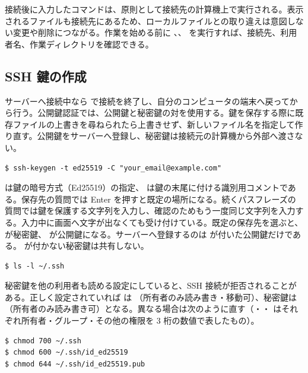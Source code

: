 接続後に入力したコマンドは、原則として接続先の計算機上で実行される。表示されるファイルも接続先にあるため、ローカルファイルとの取り違えは意図しない変更や削除につながる。作業を始める前に 、、 を実行すれば、接続先、利用者名、作業ディレクトリを確認できる。

\subsection{SSH 鍵の作成}

サーバーへ接続中なら  で接続を終了し、自分のコンピュータの端末へ戻ってから行う。公開鍵認証では、公開鍵と秘密鍵の対を使用する。鍵を保存する際に既存ファイルの上書きを尋ねられたら上書きせず、新しいファイル名を指定して作り直す。公開鍵をサーバーへ登録し、秘密鍵は接続元の計算機から外部へ渡さない。

\begin{lstlisting}[numbers=none, xleftmargin=2\zw]
$ ssh-keygen -t ed25519 -C "your_email@example.com"
\end{lstlisting}

 は鍵の暗号方式（Ed25519）の指定、 は鍵の末尾に付ける識別用コメントである。保存先の質問では Enter を押すと既定の場所になる。続くパスフレーズの質問では鍵を保護する文字列を入力し、確認のためもう一度同じ文字列を入力する。入力中に画面へ文字が出なくても受け付けている。既定の保存先を選ぶと、 が秘密鍵、 が公開鍵になる。サーバーへ登録するのは  が付いた公開鍵だけである。 が付かない秘密鍵は共有しない。

\begin{lstlisting}[numbers=none, xleftmargin=2\zw]
$ ls -l ~/.ssh
\end{lstlisting}

秘密鍵を他の利用者も読める設定にしていると、SSH 接続が拒否されることがある。正しく設定されていれば  は （所有者のみ読み書き・移動可）、秘密鍵は （所有者のみ読み書き可）となる。異なる場合は次のように直す（・・ はそれぞれ所有者・グループ・その他の権限を 3 桁の数値で表したもの）。

\begin{lstlisting}[numbers=none, xleftmargin=2\zw]
$ chmod 700 ~/.ssh
$ chmod 600 ~/.ssh/id_ed25519
$ chmod 644 ~/.ssh/id_ed25519.pub
\end{lstlisting}

